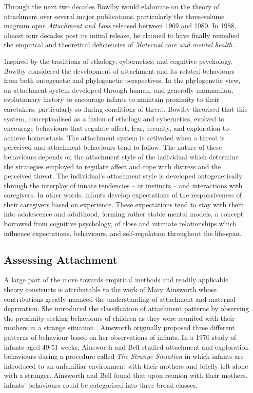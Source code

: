 \documentclass[12pt]{report}
\begin{document}
Through the next two decades Bowlby would elaborate on the theory of attachment over several major publications, particularly the three-volume magnum opus \textit{Attachment and Loss} \cite{Bowlby1969attachment, Bowlby1973separation,Bowlby1980loss} released between 1969 and 1980.
In 1988, almost four decades post its initial release, he claimed to have finally remedied the empirical and theoretical deficiencies of \textit{Maternal care and mental health} \cite{Bowlby1988}.

Inspired by the traditions of ethology, cybernetics, and cognitive psychology, Bowlby considered the development of attachment and its related behaviours from both ontogenetic and phylogenetic perspectives.
In the phylogenetic view, an attachment system developed through human, and generally mammalian, evolutionary history to encourage infants to maintain proximity to their caretakers, particularly so during conditions of threat.
Bowlby theorised that this system, conceptualised as a fusion of ethology and cybernetics, evolved to encourage behaviours that regulate affect, fear, security, and exploration to achieve homeostasis.
The attachment system is activated when a threat is perceived and attachment behaviours tend to follow. The nature of these behaviours depends on the attachment style of the individual which determine the strategies employed to regulate affect and cope with distress and the perceived threat.
The individual's attachment style is developed ontogenetically through the interplay of innate tendencies -- or instincts -- and interactions with caregivers. In other words, infants develop expectations of the responsiveness of their caregivers based on experience.
These expectations tend to stay with them into adolescence and adulthood, forming rather stable mental models, a concept borrowed from cognitive psychology, of close and intimate relationships which influence expectations, behaviours, and self-regulation throughout the life-span.

\subsection{Assessing Attachment}
A large part of the move towards empirical methods and readily applicable theory constructs is attributable to the work of Mary Ainsworth whose contributions greatly nuanced the understanding of attachment and maternal deprivation.
She introduced the classification of attachment patterns by observing the proximity-seeking behaviours of children as they were reunited with their mothers in a strange situation  \cite{Ainsworth1979, Ainsworth1970}.
Ainsworth originally proposed three different patterns of behaviour based on her observations of infants.
In a 1970 study of infants aged 49-51 weeks, Ainsworth and Bell studied attachment and exploration behaviours during a procedure called \textit{The Strange Situation} in which infants are introduced to an unfamiliar environment with their mothers and briefly left alone with a stranger.
Ainsworth and Bell found that upon reunion with their mothers, infants' behaviours could be categorised into three broad classes.
\end{document}
